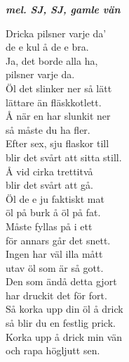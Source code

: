 \documentclass[a6paper,10pt]{article}
\newcommand{\mel}[1]{\small\textbf{\textit{mel. #1 \\}}}
\begin{document}
\setlength{\oddsidemargin}{-0.47in}
\begin{center}
    \mel{SJ, SJ, gamle vän}
\end{center}
\begin{lyrics}
Dricka pilsner varje da'\\
de e kul å de e bra.\\
Ja, det borde alla ha,\\
pilsner varje da.
\vspace{5pt}\\
Öl det slinker ner så lätt\\
lättare än fläskkotlett.\\
Å när en har slunkit ner\\
så måste du ha fler.
\vspace{5pt}\\
Efter sex, sju flaskor till\\
blir det svårt att sitta still.\\
Å vid cirka trettitvå\\
blir det svårt att gå.
\vspace{5pt}\\
Öl de e ju faktiskt mat\\
öl på burk å öl på fat.\\
Måste fyllas på i ett\\
för annars går det snett.
\vspace{5pt}\\
Ingen har väl illa mått\\
utav öl som är så gott.\\
Den som ändå detta gjort\\
har druckit det för fort.
\vspace{5pt}\\
Så korka upp din öl å drick\\
så blir du en festlig prick.\\
Korka upp å drick min vän\\
och rapa högljutt sen.
\end{lyrics}
\end{document}
